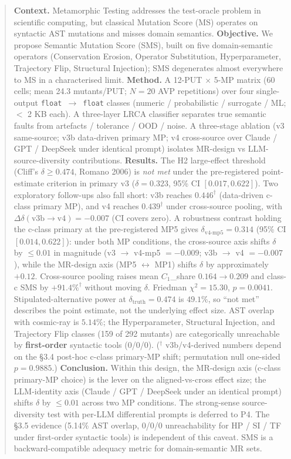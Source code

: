 \documentclass[review,12pt,authoryear]{elsarticle}
\begin{document}
\begin{frontmatter}
\begin{abstract}
\noindent\textbf{Context.} Metamorphic Testing addresses the test-oracle problem in scientific computing, but classical Mutation Score (MS) operates on syntactic AST mutations and misses domain semantics.
\textbf{Objective.} We propose Semantic Mutation Score (SMS), built on five domain-semantic operators (Conservation Erosion, Operator Substitution, Hyperparameter, Trajectory Flip, Structural Injection); SMS degenerates almost everywhere to MS in a characterised limit.
\textbf{Method.} A 12-PUT $\times$ 5-MP matrix (60 cells; mean 24.3 mutants/PUT; $N=20$ AVP repetitions) over four single-output \texttt{float}~$\to$~\texttt{float} classes (numeric / probabilistic / surrogate / ML; $<$ 2 KB each). A three-layer LRCA classifier separates true semantic faults from artefacts / tolerance / OOD / noise. A three-stage ablation (v3 same-source; v3b data-driven primary MP; v4 cross-source over Claude / GPT / DeepSeek under identical prompt) isolates MR-design vs LLM-source-diversity contributions.
\textbf{Results.} The H2 large-effect threshold (Cliff's $\delta \geq 0.474$, Romano 2006) is \emph{not met} under the pre-registered point-estimate criterion in primary v3 ($\delta = 0.323$, 95\% CI $[0.017, 0.622]$). Two exploratory follow-ups also fall short: v3b reaches $0.446^{\dagger}$ (data-driven c-class primary MP), and v4 reaches $0.439^{\dagger}$ under cross-source pooling, with $\Delta\delta(\text{v3b}\to\text{v4}) = -0.007$ (CI covers zero). A robustness contrast holding the c-class primary at the pre-registered MP5 gives $\delta_{\text{v4-mp5}} = 0.314$ (95\% CI $[0.014, 0.622]$): under both MP conditions, the cross-source axis shifts $\delta$ by $\leq 0.01$ in magnitude (v3 $\to$ v4-mp5 $= -0.009$; v3b $\to$ v4 $= -0.007$), while the MR-design axis (MP5 $\leftrightarrow$ MP1) shifts $\delta$ by approximately $+0.12$. Cross-source pooling raises mean $C_1$\_share $0.164 \to 0.209$ and class-c SMS by $+91.4\%^{\dagger}$ without moving $\delta$. Friedman $\chi^2 = 15.30$, $p = 0.0041$. Stipulated-alternative power at $\delta_{\text{truth}} = 0.474$ is $49.1\%$, so ``not met'' describes the point estimate, not the underlying effect size. AST overlap with cosmic-ray is $5.14\%$; the Hyperparameter, Structural Injection, and Trajectory Flip classes (159 of 292 mutants) are categorically unreachable by \textbf{first-order} syntactic tools (0/0/0). ($^{\dagger}$ v3b/v4-derived numbers depend on the \S3.4 post-hoc c-class primary-MP shift; permutation null one-sided $p = 0.9885$.)
\textbf{Conclusion.} Within this design, the MR-design axis (c-class primary-MP choice) is the lever on the aligned-vs-cross effect size; the LLM-identity axis (Claude / GPT / DeepSeek under an identical prompt) shifts $\delta$ by $\leq 0.01$ across two MP conditions. The strong-sense source-diversity test with per-LLM differential prompts is deferred to P4. The \S3.5 evidence (5.14\% AST overlap, 0/0/0 unreachability for HP / SI / TF under first-order syntactic tools) is independent of this caveat. SMS is a backward-compatible adequacy metric for domain-semantic MR sets.
\end{abstract}


\end{frontmatter}
\end{document}
